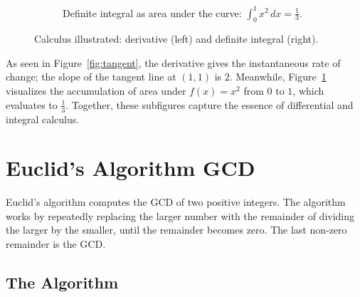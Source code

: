 \documentclass[12pt]{article}
\begin{document}
\begin{figure}[htbp]
\begin{subfigure}[b]{0.48\textwidth}
			\caption{Definite integral as area under the curve: \(\int_{0}^{1} x^2 \,dx = \frac{1}{3}\).}
			\label{fig:area}
		\end{subfigure}
		
		\caption{Calculus illustrated: derivative (left) and definite integral (right).}
		\label{fig:calculus}
	\end{figure}
	
	As seen in Figure~\ref{fig:tangent}, the derivative gives the instantaneous rate of change; the slope of the tangent line at \((1,1)\) is \(2\). 
	Meanwhile, Figure~\ref{fig:area} visualizes the accumulation of area under \(f(x)=x^2\) from \(0\) to \(1\), which evaluates to \(\frac{1}{3}\). 
	Together, these subfigures capture the essence of differential and integral calculus.
\newpage
\section{Euclid's Algorithm GCD\cite{hardy}}

Euclid's algorithm computes the GCD of two positive integers. The algorithm works by repeatedly replacing the larger number with the remainder of dividing the larger by the smaller, until the remainder becomes zero. The last non‑zero remainder is the GCD.

\subsection{The Algorithm}

\begin{algorithm}[H]
	\SetAlgoLined
	
	
	\BlankLine
	
	
	 \label{step:return}
	
	\caption{Euclid's algorithm (remainder version)}
	\label{alg:euclid}
\end{algorithm}
\end{document}
